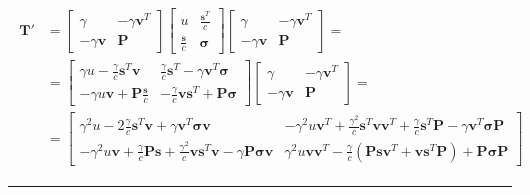 \documentclass[letterpaper,10pt,english]{jupyterBook}
\begin{document}
\begin{equation*}
\begin{split}
\begin{aligned}
 \mathbf{T}' 
 & = \begin{bmatrix} \gamma & - \gamma \mathbf{v}^T \\ -\gamma \mathbf{v} & \mathbf{P} \end{bmatrix}
\begin{bmatrix} u & \frac{\mathbf{s}^T}{c} \\ \frac{\mathbf{s}}{c} & \symbf{\sigma} \end{bmatrix}
\begin{bmatrix} \gamma & - \gamma \mathbf{v}^T \\ -\gamma \mathbf{v} & \mathbf{P} \end{bmatrix} = \\
 & =
\begin{bmatrix} \gamma u - \frac{\gamma}{c} \mathbf{s}^T \mathbf{v} & \frac{\gamma}{c} \mathbf{s}^T - \gamma \mathbf{v}^T \symbf{\sigma} \\ -\gamma u \mathbf{v} + \mathbf{P} \frac{\mathbf{s}}{c} & -\frac{\gamma}{c} \mathbf{v} \mathbf{s}^T + \mathbf{P} \symbf{\sigma} \end{bmatrix}
\begin{bmatrix} \gamma & - \gamma \mathbf{v}^T \\ -\gamma \mathbf{v} & \mathbf{P}  \end{bmatrix} = \\
 & =\begin{bmatrix}
      \gamma^2 u - 2 \frac{\gamma}{c} \mathbf{s}^T \mathbf{v} + \gamma \mathbf{v}^T \symbf{\sigma} \mathbf{v} &
      -\gamma^2 u \mathbf{v}^T + \frac{\gamma^2}{c} \mathbf{s}^T \mathbf{v} \mathbf{v}^T + \frac{\gamma}{c} \mathbf{s}^T \mathbf{P} - \gamma \mathbf{v}^T \symbf{\sigma} \mathbf{P} \\
      -\gamma^2 u \mathbf{v} + \frac{\gamma}{c} \mathbf{P} \mathbf{s} + \frac{\gamma^2}{c} \mathbf{v} \mathbf{s}^T \mathbf{v}  - \gamma  \mathbf{P}\symbf{\sigma} \mathbf{v} &
      \gamma^2 u \mathbf{v} \mathbf{v}^T - \frac{\gamma}{c} \left( \mathbf{P} \mathbf{s} \mathbf{v}^T + \mathbf{v} \mathbf{s}^T \mathbf{P} \right) + \mathbf{P} \symbf{\sigma} \mathbf{P}
    \end{bmatrix}
\end{aligned}\end{split}
\end{equation*}



\bigskip\hrule\bigskip


\sphinxstepscope
\end{document}
